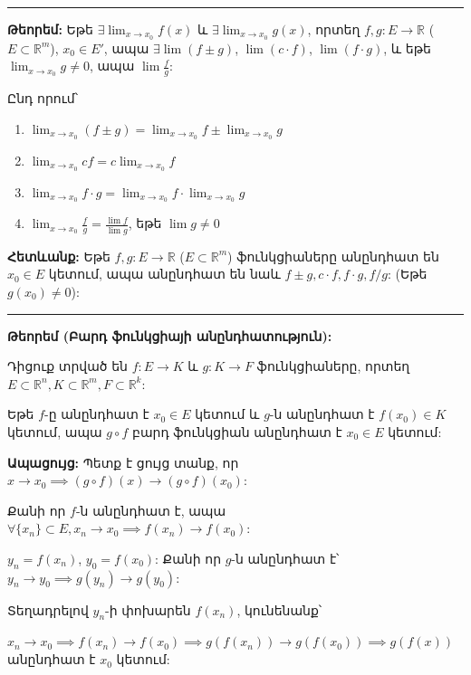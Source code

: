 \documentclass[12pt, a4paper]{article}
\begin{document}
\vspace{1em}
\hrule
\vspace{1em}

\textbf{Թեորեմ:} Եթե $\exists \lim_{x \to x_0} f(x)$ և $\exists \lim_{x \to x_0} g(x)$, որտեղ $f, g: E \to \mathbb{R}$ ($E \subset \mathbb{R}^m$), $x_0 \in E'$, ապա $\exists \lim (f \pm g)$, $\lim (c \cdot f)$, $\lim (f \cdot g)$, և եթե $\lim_{x \to x_0} g \ne 0$, ապա $\lim \frac{f}{g}$:

Ընդ որում՝

\begin{enumerate}
    \item $\lim_{x \to x_0} (f \pm g) = \lim_{x \to x_0} f \pm \lim_{x \to x_0} g$
    \item $\lim_{x \to x_0} c f = c \lim_{x \to x_0} f$
    \item $\lim_{x \to x_0} f \cdot g = \lim_{x \to x_0} f \cdot \lim_{x \to x_0} g$
    \item $\lim_{x \to x_0} \frac{f}{g} = \frac{\lim f}{\lim g}$, եթե $\lim g \ne 0$
\end{enumerate}

\textbf{Հետևանք:} Եթե $f, g: E \to \mathbb{R}$ ($E \subset \mathbb{R}^m$) ֆունկցիաները անընդհատ են $x_0 \in E$ կետում, ապա անընդհատ են նաև $f \pm g, c \cdot f, f \cdot g, f/g$: (Եթե $g(x_0) \ne 0$):

\vspace{1em}
\hrule
\vspace{1em}

\textbf{Թեորեմ (Բարդ ֆունկցիայի անընդհատություն):}

Դիցուք տրված են $f: E \to K$ և $g: K \to F$ ֆունկցիաները, որտեղ $E \subset \mathbb{R}^n, K \subset \mathbb{R}^m, F \subset \mathbb{R}^k$:

Եթե $f$-ը անընդհատ է $x_0 \in E$ կետում և $g$-ն անընդհատ է $f(x_0) \in K$ կետում, ապա $g \circ f$ բարդ ֆունկցիան անընդհատ է $x_0 \in E$ կետում:

\textbf{Ապացույց:} Պետք է ցույց տանք, որ $x \to x_0 \implies (g \circ f)(x) \to (g \circ f)(x_0)$:

Քանի որ $f$-ն անընդհատ է, ապա $\forall \{x_n\} \subset E, x_n \to x_0 \implies f(x_n) \to f(x_0)$:

$y_n = f(x_n)$, $y_0 = f(x_0)$: Քանի որ $g$-ն անընդհատ է՝ $y_n \to y_0 \implies g(y_n) \to g(y_0)$:

Տեղադրելով $y_n$-ի փոխարեն $f(x_n)$, կունենանք՝

$x_n \to x_0 \implies f(x_n) \to f(x_0) \implies g(f(x_n)) \to g(f(x_0)) \implies g(f(x))$ անընդհատ է $x_0$ կետում:
\end{document}

